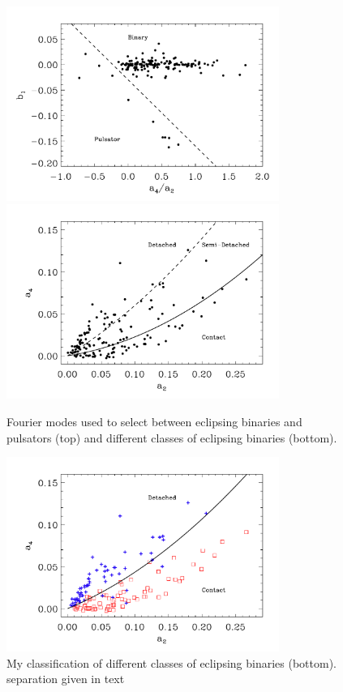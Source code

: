 \documentclass[]{emulateapj}
\begin{document}
\begin{figure}[]
\centering
\includegraphics[width=3.5in]{new_plots/four_a42b1}
\includegraphics[width=3.5in]{new_plots/four_a2a4}
\caption{Fourier modes used to select between eclipsing binaries and pulsators (top) and different classes of eclipsing binaries (bottom).}
\label{four_bb}
\end{figure}


\begin{figure}[]
\centering
\includegraphics[width=3.5in]{new_plots/four_a2a4_jrad}
\caption{My classification of different classes of eclipsing binaries (bottom). separation given in text}
\label{four_bb2}
\end{figure}
\end{document}

